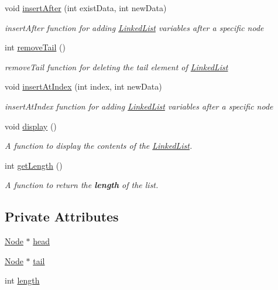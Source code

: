 \begin{DoxyCompactItemize}
void \hyperlink{classLinkedList_ae0561e6eaac19fbb49a8b53dd4f30268}{insert\-After} (int exist\-Data, int new\-Data)
\begin{DoxyCompactList}\small\item\em insert\-After function for adding \hyperlink{classLinkedList}{\-Linked\-List} variables after a specific node \end{DoxyCompactList}\item 
int \hyperlink{classLinkedList_aed09432b5dbd8584e2d9e851f3238e47}{remove\-Tail} ()
\begin{DoxyCompactList}\small\item\em remove\-Tail function for deleting the tail element of \hyperlink{classLinkedList}{\-Linked\-List} \end{DoxyCompactList}\item 
void \hyperlink{classLinkedList_ab8082d50a0ac0eb1e8cc019b125fe223}{insert\-At\-Index} (int index, int new\-Data)
\begin{DoxyCompactList}\small\item\em insert\-At\-Index function for adding \hyperlink{classLinkedList}{\-Linked\-List} variables after a specific node \end{DoxyCompactList}\item 
void \hyperlink{classLinkedList_af02eaa3695918e657f639996eae613c5}{display} ()
\begin{DoxyCompactList}\small\item\em \-A function to display the contents of the \hyperlink{classLinkedList}{\-Linked\-List}. \end{DoxyCompactList}\item 
int \hyperlink{classLinkedList_a92bb5271734b51ab089d75bf52aee919}{get\-Length} ()
\begin{DoxyCompactList}\small\item\em \-A function to return the {\bfseries length} of the list. \end{DoxyCompactList}\end{DoxyCompactItemize}
\subsection*{\-Private \-Attributes}
\begin{DoxyCompactItemize}
\item 
\hyperlink{classNode}{\-Node} $\ast$ \hyperlink{classLinkedList_a3b496be2ca8046e2a806f6e2eab33d9b}{head}
\item 
\hyperlink{classNode}{\-Node} $\ast$ \hyperlink{classLinkedList_a6ee7e26362fba74cdec9d4806ded2a21}{tail}
\item 
int \hyperlink{classLinkedList_a0ee3b52ce8c1297315a78a59de6aba24}{length}
\end{DoxyCompactItemize}



